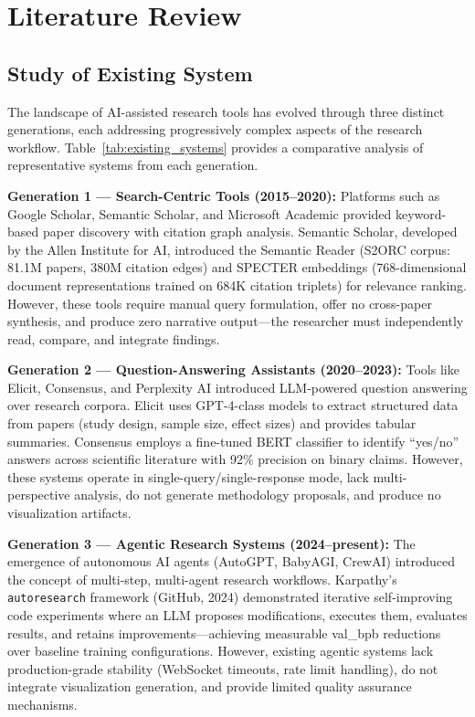 \chapter{Literature Review}

\section{Study of Existing System}

The landscape of AI-assisted research tools has evolved through three distinct generations, each addressing progressively complex aspects of the research workflow. Table~\ref{tab:existing_systems} provides a comparative analysis of representative systems from each generation.

\textbf{Generation 1 --- Search-Centric Tools (2015--2020):} Platforms such as Google Scholar, Semantic Scholar, and Microsoft Academic provided keyword-based paper discovery with citation graph analysis. Semantic Scholar, developed by the Allen Institute for AI, introduced the Semantic Reader (S2ORC corpus: 81.1M papers, 380M citation edges) and SPECTER embeddings (768-dimensional document representations trained on 684K citation triplets) for relevance ranking. However, these tools require manual query formulation, offer no cross-paper synthesis, and produce zero narrative output---the researcher must independently read, compare, and integrate findings.

\textbf{Generation 2 --- Question-Answering Assistants (2020--2023):} Tools like Elicit, Consensus, and Perplexity AI introduced LLM-powered question answering over research corpora. Elicit uses GPT-4-class models to extract structured data from papers (study design, sample size, effect sizes) and provides tabular summaries. Consensus employs a fine-tuned BERT classifier to identify ``yes/no'' answers across scientific literature with 92\% precision on binary claims. However, these systems operate in single-query/single-response mode, lack multi-perspective analysis, do not generate methodology proposals, and produce no visualization artifacts.

\textbf{Generation 3 --- Agentic Research Systems (2024--present):} The emergence of autonomous AI agents (AutoGPT, BabyAGI, CrewAI) introduced the concept of multi-step, multi-agent research workflows. Karpathy's \texttt{autoresearch} framework (GitHub, 2024) demonstrated iterative self-improving code experiments where an LLM proposes modifications, executes them, evaluates results, and retains improvements---achieving measurable val\_bpb reductions over baseline training configurations. However, existing agentic systems lack production-grade stability (WebSocket timeouts, rate limit handling), do not integrate visualization generation, and provide limited quality assurance mechanisms.

